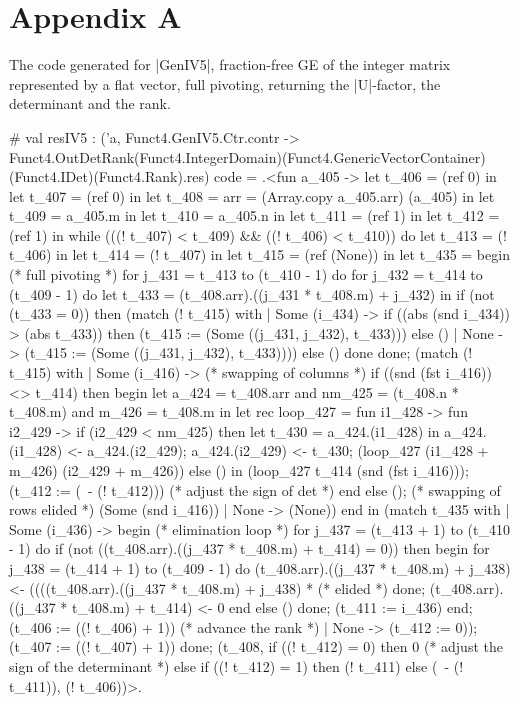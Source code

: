 \documentclass[draft]{elsart}
\begin{document}
\section{Appendix A}
The code generated for |GenIV5|, fraction-free GE of the integer matrix
represented by a flat vector, full pivoting, returning the |U|-factor,
the determinant and the rank.
\begin{code2}
# val resIV5 : ('a,
   Funct4.GenIV5.Ctr.contr ->
   Funct4.OutDetRank(Funct4.IntegerDomain)(Funct4.GenericVectorContainer)
                    (Funct4.IDet)(Funct4.Rank).res) code =
  .<fun a_405 ->
   let t_406 = (ref 0) in let t_407 = (ref 0) in
   let t_408 = {arr = (Array.copy a_405.arr)} (a_405) in
   let t_409 = a_405.m in let t_410 = a_405.n in
   let t_411 = (ref 1) in let t_412 = (ref 1) in
   while (((! t_407) < t_409) && ((! t_406) < t_410)) do
    let t_413 = (! t_406) in let t_414 = (! t_407) in
    let t_415 = (ref (None)) in
    let t_435 =
     begin  (* full pivoting *)
      for j_431 = t_413 to (t_410 - 1) do
       for j_432 = t_414 to (t_409 - 1) do
        let t_433 = (t_408.arr).((j_431 * t_408.m) + j_432) in
        if (not (t_433 = 0)) then
         (match (! t_415) with
          | Some (i_434) ->
             if ((abs (snd i_434)) > (abs t_433)) then
              (t_415 := (Some ((j_431, j_432), t_433))) else ()
          | None -> (t_415 := (Some ((j_431, j_432), t_433))))
        else ()
       done
      done;
      (match (! t_415) with
       | Some (i_416) ->  (* swapping of columns *)
          if ((snd (fst i_416)) <> t_414) then begin
           let a_424 = t_408.arr and nm_425 = (t_408.n * t_408.m)
           and m_426 = t_408.m in
           let rec loop_427 =
            fun i1_428 -> fun i2_429 ->
              if (i2_429 < nm_425) then
               let t_430 = a_424.(i1_428) in
               a_424.(i1_428) <- a_424.(i2_429);
               a_424.(i2_429) <- t_430;
               (loop_427 (i1_428 + m_426) (i2_429 + m_426))
              else () in
           (loop_427 t_414 (snd (fst i_416)));
           (t_412 := (~- (! t_412))) (* adjust the sign of det *)
          end else (); (* swapping of rows elided *)
          (Some (snd i_416))
       | None -> (None))
     end in
    (match t_435 with
     | Some (i_436) ->
        begin (* elimination loop *)
         for j_437 = (t_413 + 1) to (t_410 - 1) do
          if (not ((t_408.arr).((j_437 * t_408.m) + t_414) = 0)) then begin
           for j_438 = (t_414 + 1) to (t_409 - 1) do
            (t_408.arr).((j_437 * t_408.m) + j_438) <-
             ((((t_408.arr).((j_437 * t_408.m) + j_438) * (* elided *)
           done;
           (t_408.arr).((j_437 * t_408.m) + t_414) <- 0
          end else ()
         done; (t_411 := i_436)
        end;
        (t_406 := ((! t_406) + 1)) (* advance the rank *)
     | None -> (t_412 := 0));
    (t_407 := ((! t_407) + 1))
   done;
   (t_408, 
    if ((! t_412) = 0) then 0 (* adjust the sign of the determinant *)
    else if ((! t_412) = 1) then (! t_411)
    else (~- (! t_411)), (! t_406))>.
\end{code2}
\end{document}
